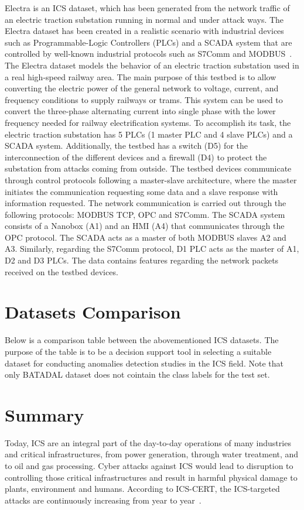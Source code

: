 \documentclass[english,12pt]{article}
\begin{document}
Electra is an ICS dataset, which has been generated from the network traffic of an electric traction substation
running in normal and under attack ways. The Electra dataset has been created in a realistic scenario with
industrial devices such as Programmable-Logic Controllers (PLCs) and a SCADA system that are controlled by
well-known industrial protocols such as S7Comm and MODBUS~\cite{gomez2019generation}.
The Electra dataset models the behavior of an electric traction substation used in a real high-speed railway
area. The main purpose of this testbed is to allow converting the electric power of the general network to
voltage, current, and frequency conditions to supply railways or trams. This system can be used to convert
the three-phase alternating current into single phase with the lower frequency needed for railway electrification
systems. To accomplish its task, the electric traction substation has 5 PLCs (1 master PLC and 4 slave PLCs) and
a SCADA system. Additionally, the testbed has a switch (D5) for the interconnection of the different devices and
a firewall (D4) to protect the substation from attacks coming from outside. The testbed devices communicate through
control protocols following a master-slave architecture, where the master initiates the communication requesting
some data and a slave response with information requested. The network communication is carried out through the
following protocols: MODBUS TCP, OPC and S7Comm. The SCADA system consists of a Nanobox (A1) and an HMI (A4) that
communicates through the OPC protocol. The SCADA acts as a master of both MODBUS slaves A2 and A3. Similarly,
regarding the S7Comm protocol, D1 PLC acts as the master of A1, D2 and D3 PLCs. The data contains features
regarding the network packets received on the testbed devices.


\section{Datasets Comparison} \label{comparison}
Below is a comparison table between the abovementioned ICS datasets. The purpose of the table is to be a
decision support tool in selecting a suitable dataset for conducting anomalies detection studies in the
ICS field. Note that only BATADAL dataset does not cointain the class labels for the test set.



\pagebreak{}

\section{Summary} \label{summary}
Today, ICS are an integral part of the day-to-day operations of many industries and critical infrastructures,
from power generation, through water treatment, and to oil and gas processing. Cyber attacks against ICS would
lead to disruption to controlling those critical infrastructures and result in harmful physical damage to plants,
environment and humans. According to ICS-CERT, the ICS-targeted attacks are continuously increasing from year to year~\cite{DBLP:conf/dsn/FengLC17}.
\end{document}
